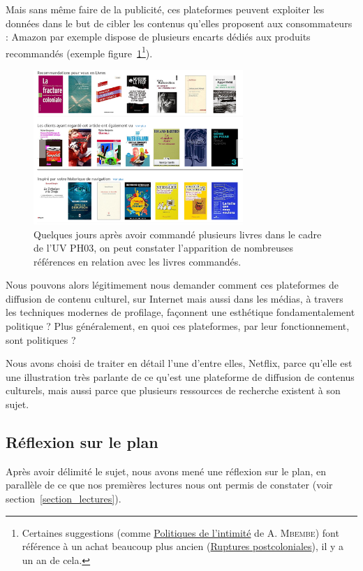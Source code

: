 \documentclass[a4paper,10pt]{article}
\begin{document}
Mais sans même faire de la publicité, ces plateformes peuvent exploiter les données dans le but de cibler les contenus qu'elles proposent aux consommateurs : Amazon par exemple dispose de plusieurs encarts dédiés aux produits recommandés (exemple figure~\ref{amazon}\footnote{Certaines suggestions (comme \underline{Politiques de l'intimité} de A. \textsc{Mbembe}) font référence à un achat beaucoup plus ancien (\underline{Ruptures postcoloniales}), il y a un an de cela.}).

\begin{figure}[ht]
 \begin{center}
  \includegraphics[width=300px]{img/amazon.png}
 \end{center}
		\caption{Quelques jours après avoir commandé plusieurs livres dans le cadre de l'UV PH03, on peut constater l'apparition de nombreuses références en relation avec les livres commandés.}
 \label{amazon}
\end{figure}

Nous pouvons alors légitimement nous demander comment ces plateformes de diffusion de contenu culturel, sur Internet mais aussi dans les médias, à travers les techniques modernes de profilage, façonnent une esthétique fondamentalement politique ? Plus généralement, en quoi ces plateformes, par leur fonctionnement, sont politiques ?

Nous avons choisi de traiter en détail l'une d'entre elles, Netflix, parce qu'elle est une illustration très parlante de ce qu'est une plateforme de diffusion de contenus culturels, mais aussi parce que plusieurs ressources de recherche existent à son sujet.

\subsection{Réflexion sur le plan}

Après avoir délimité le sujet, nous avons mené une réflexion sur le plan, en parallèle de ce que nos premières lectures nous ont permis de constater (voir section~\ref{section_lectures}).
\end{document}
